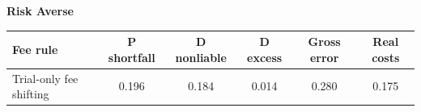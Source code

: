 \documentclass[10pt,border=5pt,varwidth=17cm]{standalone}
\begin{document}
\begingroup
\small
\setlength{\tabcolsep}{5pt}
\renewcommand{\arraystretch}{1.20}
\noindent\textbf{Risk Averse}\par\smallskip
\noindent\begin{tabularx}{\linewidth}{@{}>{\raggedright\arraybackslash}Xccccc@{}}
\toprule
\textbf{Fee rule} & \textbf{P shortfall} & \textbf{D nonliable} & \textbf{D excess} & \textbf{Gross error} & \textbf{Real costs} \\
\midrule
Trial-only fee shifting & 0.196 & 0.184 & 0.014 & 0.280 & 0.175 \\
\bottomrule\end{tabularx}\par\medskip
\endgroup
\end{document}
